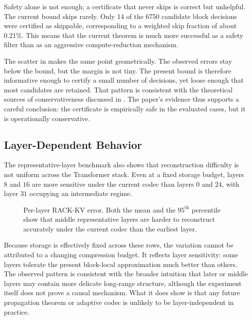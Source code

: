 Safety alone is not enough; a certificate that never skips is correct but unhelpful. The current bound skips rarely. Only \num{14} of the \num{6750} candidate block decisions were certified as skippable, corresponding to a weighted skip fraction of about \num{0.21}\%. This means that the current theorem is much more successful as a safety filter than as an aggressive compute-reduction mechanism.

The scatter in  makes the same point geometrically. The observed errors stay below the bound, but the margin is not tiny. The present bound is therefore informative enough to certify a small number of decisions, yet loose enough that most candidates are retained. That pattern is consistent with the theoretical sources of conservativeness discussed in . The paper's evidence thus supports a careful conclusion: the certificate is empirically safe in the evaluated cases, but it is operationally conservative.

\subsection{Layer-Dependent Behavior}

The representative-layer benchmark also shows that reconstruction difficulty is not uniform across the Transformer stack. Even at a fixed storage budget, layers \(8\) and \(16\) are more sensitive under the current codec than layers \(0\) and \(24\), with layer \(31\) occupying an intermediate regime.

\begin{table}[t]
  \centering
  \small
  
  \caption{Per-layer RACK-KV error in the representative-layer benchmark. The mean serialized storage is approximately \num{56.2}~kB for every row by construction, so the table isolates layer-dependent error rather than layer-dependent storage.}
  \label{tab:perlayer}
\end{table}

\begin{figure}[t]
  \centering
  
  \caption{Per-layer RACK-KV error. Both the mean and the \(95^{\text{th}}\) percentile show that middle representative layers are harder to reconstruct accurately under the current codec than the earliest layer.}
  \label{fig:perlayer}
\end{figure}

Because storage is effectively fixed across these rows, the variation cannot be attributed to a changing compression budget. It reflects layer sensitivity: some layers tolerate the present block-local approximation much better than others. The observed pattern is consistent with the broader intuition that later or middle layers may contain more delicate long-range structure, although the experiment itself does not prove a causal mechanism. What it does show is that any future propagation theorem or adaptive codec is unlikely to be layer-independent in practice.

